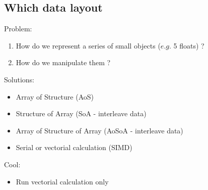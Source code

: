 \documentclass{beamer}
\begin{document}
\subsection*{Which data layout}
\begin{frame}
Problem: 
\begin{enumerate}
\item How do we represent a series of small objects ($e.g.$ 5 floats) ? 
\item How do we manipulate them ? 
\end{enumerate}
Solutions:
\begin{itemize}
\item Array of Structure  (AoS)
\item Structure of Array (SoA - interleave data)
\item  Array of Structure of Array (AoSoA - interleave data)
\item Serial or vectorial calculation (SIMD)
\end{itemize}

Cool:
\begin{itemize}
\item Run vectorial calculation only
\end{itemize}
 
\end{frame}



\end{document}
